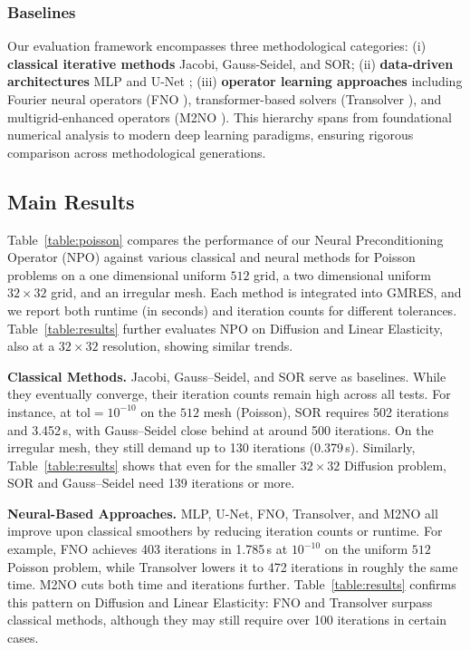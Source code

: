 \subsubsection{Baselines}
\label{subsec:baselines}

Our evaluation framework encompasses three methodological categories: 
(i) \textbf{classical iterative methods} Jacobi, Gauss-Seidel, and SOR; 
(ii) \textbf{data-driven architectures} MLP \cite{86:mlp} and U-Net \cite{15:UNet}; (iii) \textbf{operator learning approaches} including Fourier neural operators (FNO \cite{21:fno}), 
transformer-based solvers (Transolver \cite{24:Transolver}), 
and multigrid-enhanced operators (M2NO \cite{24:M2NO}). 
This hierarchy spans from foundational numerical analysis to modern deep learning paradigms, ensuring rigorous comparison across methodological generations.



\subsection{Main Results}
\label{subsec:results}
Table~\ref{table:poisson} compares the performance of our Neural Preconditioning Operator (NPO) against various classical and neural methods for Poisson problems on a one dimensional uniform \(512\) grid, a two dimensional uniform \(32\times32\) grid, and an irregular mesh. Each method is integrated into GMRES, and we report both runtime (in seconds) and iteration counts for different tolerances. Table~\ref{table:results} further evaluates NPO on Diffusion and Linear Elasticity, also at a \(32\times32\) resolution, showing similar trends.

\textbf{Classical Methods.}
Jacobi, Gauss--Seidel, and SOR serve as baselines. While they eventually converge, their iteration counts remain high across all tests. For instance, at \(\mathrm{tol}=10^{-10}\) on the \(512\) mesh (Poisson), SOR requires 502 iterations and 3.452\,s, with Gauss--Seidel close behind at around 500 iterations. On the irregular mesh, they still demand up to 130 iterations (0.379\,s). Similarly, Table~\ref{table:results} shows that even for the smaller \(32\times32\) Diffusion problem, SOR and Gauss--Seidel need 139 iterations or more.

\textbf{Neural-Based Approaches.}
MLP, U-Net, FNO, Transolver, and M2NO all improve upon classical smoothers by reducing iteration counts or runtime. For example, FNO achieves 403 iterations in 1.785\,s at \(10^{-10}\) on the uniform \(512\) Poisson problem, while Transolver lowers it to 472 iterations in roughly the same time. M2NO cuts both time and iterations further. Table~\ref{table:results} confirms this pattern on Diffusion and Linear Elasticity: FNO and Transolver surpass classical methods, although they may still require over 100 iterations in certain cases.

